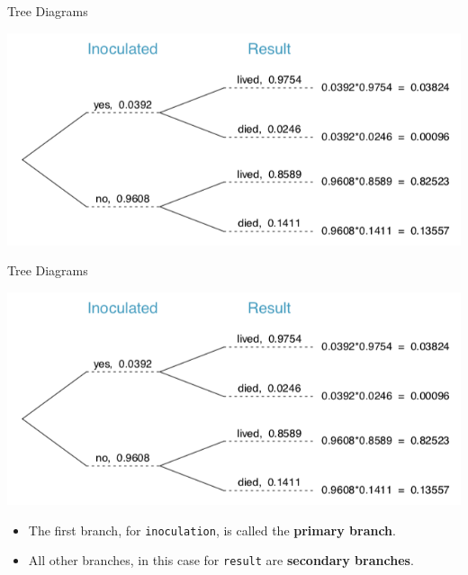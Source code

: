 \begin{frame}{Tree Diagrams}
    \begin{center}
        \includegraphics[scale=0.5]{images/tree.png}
    \end{center}
\end{frame}

\begin{frame}{Tree Diagrams}
    \begin{center}
        \includegraphics[scale=0.3]{images/tree.png}
    \end{center}
    \begin{itemize}
        \item The first branch, for \texttt{inoculation}, is called the \textbf{primary branch}.
        \item All other branches, in this case for \texttt{result} are \textbf{secondary branches}.
    \end{itemize}
\end{frame}

